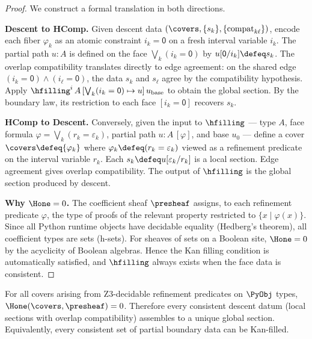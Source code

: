 \begin{proof}
We construct a formal translation in both directions.

\medskip
\noindent\textbf{Descent to HComp.}
Given descent data $(\covers, \{s_k\}, \{\text{compat}_{k\ell}\})$,
encode each fiber $\varphi_k$ as an atomic constraint $i_k = \mathsf{0}$
on a fresh interval variable $i_k$.  The partial path
$u : A$ is defined on the face $\bigvee_k (i_k = \mathsf{0})$ by
$u[\mathsf{0}/i_k] \defeq s_k$.  The overlap compatibility translates
directly to edge agreement: on the shared edge
$(i_k = \mathsf{0}) \wedge (i_\ell = \mathsf{0})$, the data
$s_k$ and $s_\ell$ agree by the compatibility hypothesis.
Apply $\hfilling^i\, A\, [\bigvee_k (i_k = \mathsf{0}) \mapsto u]\,
u_{\mathrm{base}}$ to obtain the global section.  By the boundary law,
its restriction to each face $[i_k = \mathsf{0}]$ recovers $s_k$.

\medskip
\noindent\textbf{HComp to Descent.}
Conversely, given the input to $\hfilling$ --- type $A$, face formula
$\varphi = \bigvee_k (r_k = \varepsilon_k)$, partial path $u : A\,[\varphi]$,
and base $u_0$ --- define a cover $\covers \defeq \{\varphi_k\}$ where
$\varphi_k \defeq (r_k = \varepsilon_k)$ viewed as a refinement predicate on
the interval variable $r_k$.  Each $s_k \defeq u[\varepsilon_k / r_k]$
is a local section.  Edge agreement gives overlap compatibility.
The output of $\hfilling$ is the global section produced by descent.

\medskip
\noindent\textbf{Why $\Hone = 0$.}
The coefficient sheaf $\presheaf$ assigns, to each refinement predicate
$\varphi$, the type of proofs of the relevant property restricted to
$\{x \mid \varphi(x)\}$.  Since all Python runtime objects have
decidable equality (Hedberg's theorem), all coefficient types are sets
(h-sets).  For sheaves of sets on a Boolean site, $\Hone = 0$ by the
acyclicity of Boolean algebras.  Hence the Kan filling condition is
automatically satisfied, and $\hfilling$ always exists when the face
data is consistent.
\end{proof}

\begin{corollary}
\label{cor:no-obstruction}
For all covers arising from Z3-decidable refinement predicates on
$\PyObj$ types, $\Hone(\covers, \presheaf) = 0$.  Therefore every
consistent descent datum (local sections with overlap compatibility)
assembles to a unique global section.  Equivalently, every consistent
set of partial boundary data can be Kan-filled.
\end{corollary}

